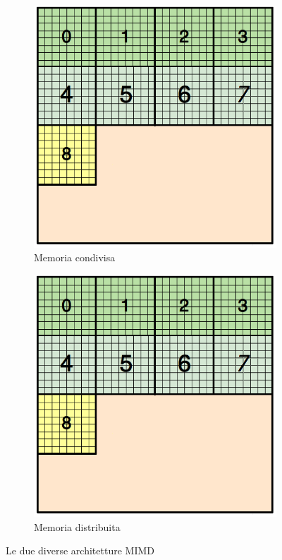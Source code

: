\begin{figure}[H]
	\centering
	\begin{subfigure}{0.5\textwidth}
		\centering
		\includegraphics[width=0.9\linewidth]{immagini/block_on_grid.png}
		\caption{Memoria condivisa}
		\label{fig:mem_cond}
	\end{subfigure}%
	\begin{subfigure}{0.5\textwidth}
		\centering
		\includegraphics[width=1.0\linewidth]{immagini/block_on_grid.png}
		\caption{Memoria distribuita}
		\label{fig:mem_dist}
	\end{subfigure}
	\label{fig:mem_cond_dist}
	\caption{Le due diverse architetture MIMD}
\end{figure}
